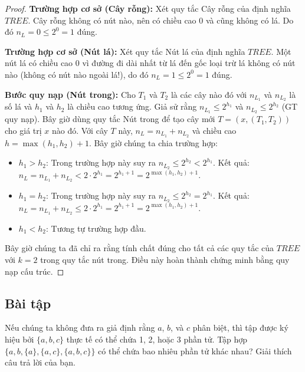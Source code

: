 \begin{proof}
\textbf{Trường hợp cơ sở (Cây rỗng):} Xét quy tắc Cây rỗng của định nghĩa $TREE$. Cây rỗng không có nút nào, nên có chiều cao $0$ và cũng không có lá. Do đó $n_L = 0 \leq 2^0 = 1$ đúng.

\textbf{Trường hợp cơ sở (Nút lá):} Xét quy tắc Nút lá của định nghĩa $TREE$. Một nút lá có chiều cao $0$ vì đường đi dài nhất từ lá đến gốc loại trừ lá không có nút nào (không có nút nào ngoài lá!), do đó $n_L = 1 \leq 2^0 = 1$ đúng.

\textbf{Bước quy nạp (Nút trong):} Cho $T_1$ và $T_2$ là các cây nào đó với $n_{L_1}$ và $n_{L_2}$ là số lá và $h_1$ và $h_2$ là chiều cao tương ứng. Giả sử rằng $n_{L_1} \leq 2^{h_1}$ và $n_{L_2} \leq 2^{h_2}$ (GT quy nạp). Bây giờ dùng quy tắc Nút trong để tạo cây mới $T = (x, (T_1, T_2))$ cho giá trị $x$ nào đó. Với cây $T$ này, $n_L = n_{L_1} + n_{L_2}$ và chiều cao $h = \max(h_1, h_2) + 1$. Bây giờ chúng ta chia trường hợp:

\begin{itemize}
\item $h_1 > h_2$: Trong trường hợp này suy ra $n_{L_2} \leq 2^{h_2} < 2^{h_1}$. Kết quả: $n_L = n_{L_1} + n_{L_2} < 2 \cdot 2^{h_1} = 2^{h_1 + 1} = 2^{\max(h_1, h_2) + 1}$.
\item $h_1 = h_2$: Trong trường hợp này suy ra $n_{L_2} \leq 2^{h_2} = 2^{h_1}$. Kết quả: $n_L = n_{L_1} + n_{L_2} \leq 2 \cdot 2^{h_1} = 2^{h_1 + 1} = 2^{\max(h_1, h_2) + 1}$.
\item $h_1 < h_2$: Tương tự trường hợp đầu.
\end{itemize}

Bây giờ chúng ta đã chỉ ra rằng tính chất đúng cho tất cả các quy tắc của $TREE$ với $k = 2$ trong quy tắc nút trong. Điều này hoàn thành chứng minh bằng quy nạp cấu trúc.
\end{proof}

\subsection*{Bài tập}

\begin{exercise}
Nếu chúng ta không đưa ra giả định rằng $a$, $b$, và $c$ phân biệt, thì tập được ký hiệu bởi $\{a, b, c\}$ thực tế có thể chứa 1, 2, hoặc 3 phần tử. Tập hợp $\{a, b, \{a\}, \{a, c\}, \{a, b, c\}\}$ có thể chứa bao nhiêu phần tử khác nhau? Giải thích câu trả lời của bạn.
\end{exercise}


